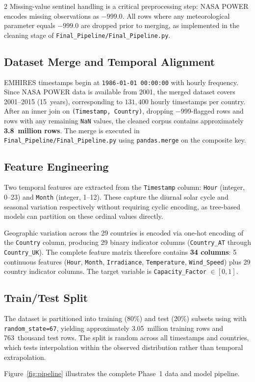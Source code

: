 \documentclass[11pt]{article}
\begin{document}
\begin{multicols}{2}
Missing-value sentinel handling is a critical preprocessing step: NASA POWER
encodes missing observations as \(-999.0\). All rows where any meteorological
parameter equals \(-999.0\) are dropped prior to merging, as implemented in the
cleaning stage of \texttt{Final\_Pipeline/Final\_Pipeline.py}.

\subsection{Dataset Merge and Temporal Alignment}

EMHIRES timestamps begin at \texttt{1986-01-01 00:00:00} with hourly frequency.
Since NASA POWER data is available from 2001, the merged dataset covers
2001--2015 (15~years), corresponding to \(131{,}400\) hourly timestamps per
country. After an inner join on \texttt{(Timestamp, Country)}, dropping
\(-999\)-flagged rows and rows with any remaining \texttt{NaN} values, the
cleaned corpus contains approximately \textbf{3.8~million rows}. The merge is
executed in \texttt{Final\_Pipeline/Final\_Pipeline.py} using
\texttt{pandas.merge} on the composite key.

\subsection{Feature Engineering}

Two temporal features are extracted from the \texttt{Timestamp} column:
\texttt{Hour} (integer, 0--23) and \texttt{Month} (integer, 1--12). These
capture the diurnal solar cycle and seasonal variation respectively without
requiring cyclic encoding, as tree-based models can partition on these ordinal
values directly.

Geographic variation across the 29 countries is encoded via one-hot encoding
of the \texttt{Country} column, producing 29 binary indicator columns
(\texttt{Country\_AT} through \texttt{Country\_UK}). The complete feature
matrix therefore contains \textbf{34 columns}: 5 continuous features
(\texttt{Hour}, \texttt{Month}, \texttt{Irradiance}, \texttt{Temperature},
\texttt{Wind\_Speed}) plus 29 country indicator columns. The target variable
is \texttt{Capacity\_Factor} $\in [0, 1]$.

\subsection{Train/Test Split}

The dataset is partitioned into training (80\%) and test (20\%) subsets using
 with \texttt{random\_state=67},
yielding approximately 3.05~million training rows and 763~thousand test rows.
The split is random across all timestamps and countries, which tests
interpolation within the observed distribution rather than temporal
extrapolation.

Figure~\ref{fig:pipeline} illustrates the complete Phase~1 data and model pipeline.

\end{multicols}
\end{document}
